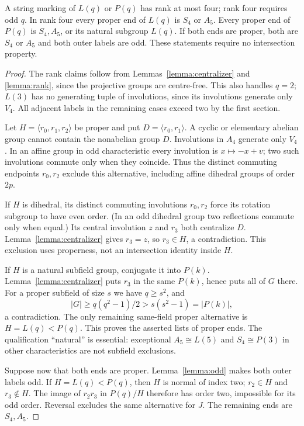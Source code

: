 \begin{theorem}\label{thm:projective}
A string marking of $L(q)$ or $P(q)$ has rank at most four; rank four
requires odd $q$. In rank four every proper end of $L(q)$ is $S_4$ or
$A_5$. Every proper end of $P(q)$ is $S_4,A_5$, or its natural subgroup
$L(q)$. If both ends are proper, both are $S_4$ or $A_5$ and both outer
labels are odd. These statements require no intersection property.
\end{theorem}
\begin{proof}
The rank claims follow from Lemmas~\ref{lemma:centralizer} and
\ref{lemma:rank}, since the projective groups are centre-free. This also
handles $q=2$; $L(3)$ has no generating tuple of involutions, since its
involutions generate only $V_4$. All adjacent labels in the remaining
cases exceed two by the first section.

Let $H=\langle r_0,r_1,r_2\rangle$ be proper and put
$D=\langle r_0,r_1\rangle$. A cyclic or elementary abelian group cannot
contain the nonabelian group $D$. Involutions in $A_4$ generate only
$V_4$. In an affine group in odd characteristic every involution is
$x\mapsto-x+v$; two such involutions commute only when they coincide.
Thus the distinct commuting endpoints $r_0,r_2$ exclude this alternative,
including affine dihedral groups of order $2p$.

If $H$ is dihedral, its distinct commuting involutions $r_0,r_2$ force
its rotation subgroup to have even order. (In an odd dihedral group two
reflections commute only when equal.) Its central involution $z$ and
$r_3$ both centralize $D$. Lemma~\ref{lemma:centralizer} gives $r_3=z$,
so $r_3\in H$, a contradiction. This exclusion uses properness, not an
intersection identity inside $H$.

If $H$ is a natural subfield group, conjugate it into $P(k)$.
Lemma~\ref{lemma:centralizer} puts $r_3$ in the same $P(k)$, hence puts
all of $G$ there. For a proper subfield of size $s$ we have $q\ge s^2$,
and
\[
 |G|\ge q(q^2-1)/2>s(s^2-1)=|P(k)|,
\]
a contradiction. The only remaining same-field proper alternative is
$H=L(q)<P(q)$. This proves the asserted lists of proper ends. The
qualification ``natural'' is essential: exceptional $A_5\cong L(5)$
and $S_4\cong P(3)$ in other characteristics are not subfield exclusions.

Suppose now that both ends are proper. Lemma~\ref{lemma:odd} makes both
outer labels odd. If $H=L(q)<P(q)$, then $H$ is normal of index two;
$r_2\in H$ and $r_3\notin H$. The image of $r_2r_3$ in $P(q)/H$
therefore has order two, impossible for its odd order. Reversal excludes
the same alternative for $J$. The remaining ends are $S_4,A_5$.
\end{proof}

